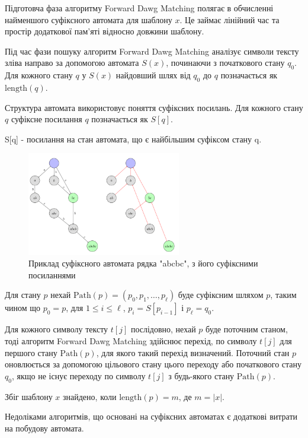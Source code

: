 \documentclass[a4paper,14pt]{extarticle} %
\begin{document}
Підготовча фаза алгоритму Forward Dawg Matching полягає в обчисленні найменшого суфіксного автомата для шаблону \( x \). Це займає лінійний час та простір додаткової пам'яті відносно довжини шаблону.

Під час фази пошуку алгоритм Forward Dawg Matching аналізує символи тексту зліва направо за допомогою автомата \( S(x) \), починаючи з початкового стану \( q_0 \). Для кожного стану \( q \) у \( S(x) \) найдовший шлях від \( q_0 \) до \( q \) позначається як \( \text{length}(q) \).

Структура автомата використовує поняття суфіксних посилань. Для кожного стану \( q \) суфіксне посилання \( q \) позначається як \( S[q] \).

S[q] - посилання на стан автомата, що є найбільшим суфіксом стану q.

\begin{figure}[h]
	\centering
	\includegraphics[width=0.6\textwidth]{images/suffix_automata.png}
	\caption{Приклад суфіксного автомата рядка "abcbc", з його суфіксними посиланнями}
	\label{fig:fdm}
\end{figure}

Для стану \( p \) нехай \( \text{Path}(p) = (p_0, p_1, \ldots, p_{\ell}) \) буде суфіксним шляхом \( p \), таким чином що \( p_0 = p \), для \( 1 \leq i \leq \ell \), \( p_i = S[p_{i-1}] \) і \( p_{\ell} = q_0 \).

Для кожного символу тексту \( t[j] \) послідовно, нехай \( p \) буде поточним станом, тоді алгоритм Forward Dawg Matching здійснює перехід, по символу \( t[j] \) для першого стану \( \text{Path}(p) \), для якого такий перехід визначений. Поточний стан \( p \) оновлюється за допомогою цільового стану цього переходу або початкового стану \( q_0 \), якщо не існує переходу по символу \( t[j] \) з будь-якого стану \( \text{Path}(p) \).

Збіг шаблону \( x \) знайдено, коли \( \text{length}(p) = m \), де $m =|x|$.

Недоліками алгоритмів, що основані на суфіксних автоматах є додаткові витрати на побудову автомата.
\end{document}
